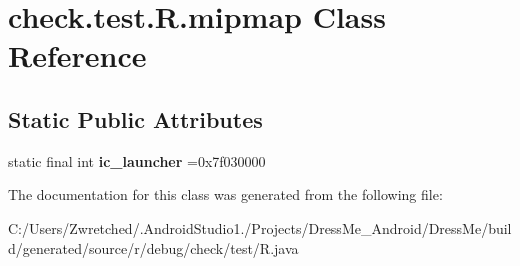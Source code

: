 \hypertarget{classcheck_1_1test_1_1_r_1_1mipmap}{}\section{check.\+test.\+R.\+mipmap Class Reference}
\label{classcheck_1_1test_1_1_r_1_1mipmap}
\subsection*{Static Public Attributes}
\begin{DoxyCompactItemize}
\item 
\hypertarget{classcheck_1_1test_1_1_r_1_1mipmap_ae5cc040210eaf00cf2d3c5cb0950bbc1}{}static final int {\bfseries ic\+\_\+launcher} =0x7f030000\label{classcheck_1_1test_1_1_r_1_1mipmap_ae5cc040210eaf00cf2d3c5cb0950bbc1}

\end{DoxyCompactItemize}


The documentation for this class was generated from the following file\+:\begin{DoxyCompactItemize}
\item 
C\+:/\+Users/\+Zwretched/.\+Android\+Studio1./\+Projects/\+Dress\+Me\+\_\+\+Android/\+Dress\+Me/build/generated/source/r/debug/check/test/R.\+java\end{DoxyCompactItemize}
